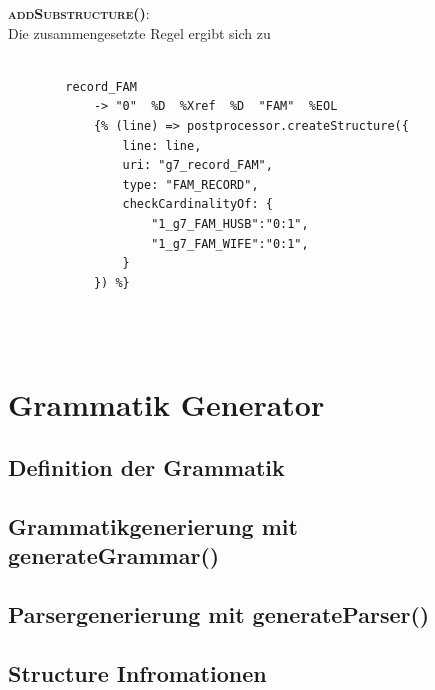 \vspace{1em}
\textsc{\textbf{addSubstructure()}:} \vspace{0.5em} \\
Die zusammengesetzte Regel ergibt sich zu 
\\ \\
\begin{minipage}{1.0\textwidth} \small
	\begin{lstlisting}
		record_FAM
			-> "0"  %D  %Xref  %D  "FAM"  %EOL
			{% (line) => postprocessor.createStructure({
				line: line,
				uri: "g7_record_FAM", 
				type: "FAM_RECORD", 
				checkCardinalityOf: {
					"1_g7_FAM_HUSB":"0:1", 
					"1_g7_FAM_WIFE":"0:1",
				}
			}) %}
	\end{lstlisting}
	\label{lst: nearley regel family record mit postprozessor und substructs}
\end{minipage}
\\ \\

\section{Grammatik Generator}
\label{sec: Implementierung - Grammatik Generator}
%
\subsection{Definition der Grammatik}
\label{subsec: Implementierung - Grammatik Generator - Definition der Grammatik}

\subsection{Grammatikgenerierung mit generateGrammar()}
\label{subsec: Implementierung - Grammatik Generator - generateGrammar}

\subsection{Parsergenerierung mit generateParser()}
\label{subsec: Implementierung - Grammatik Generator - generateParser}

\subsection{Structure Infromationen}
\label{subsec: Implementierung - Grammatik Generator - Structure Infromationen}


